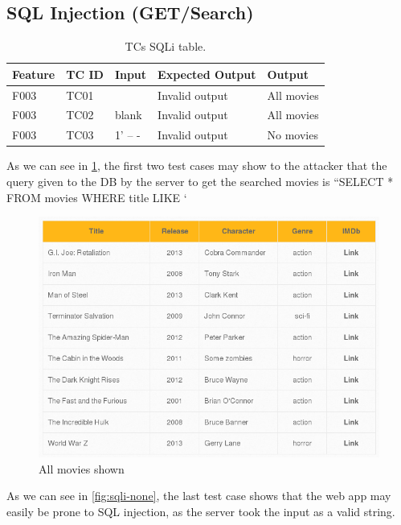 \documentclass{article}
\begin{document}
\subsection{SQL Injection (GET/Search)}
\begin{table} [htpb]
    \centering
    \begin{tabular}{l|l|l|l|l}
        Feature & TC ID & Input   & Expected Output & Output     \\ \hline
        F003    & TC01  &         & Invalid output  & All movies \\
        F003    & TC02  & blank   & Invalid output  & All movies \\
        F003    & TC03  & 1’ -- - & Invalid output  & No movies  \\
    \end{tabular}
    \caption{\label{tab:TC-SQLi}TCs SQLi table.}
\end{table}

As we can see in \ref{fig:sqli-all}, the first two test cases may show to the attacker that the query given to the DB by the server to get the searched movies is “SELECT * FROM movies WHERE title LIKE ‘%

\begin{figure}
    \centering
    \includegraphics[width=1\linewidth]{Figures/sqli/sqli_oopsie.png}
    \caption{\label{fig:sqli-all}All movies shown}
\end{figure}

As we can see in \ref{fig:sqli-none}, the last test case shows that the web app may easily be prone to SQL injection, as the server took the input as a valid string.
\end{document}
